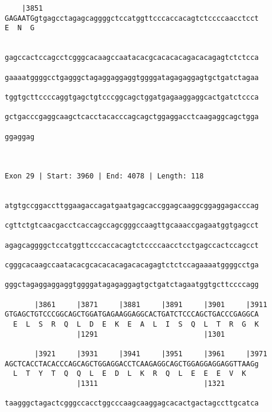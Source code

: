 \documentclass{article}
\begin{document}
\begin{Verbatim}
    |3851                                                   
GAGAATGgtgagcctagagcaggggctccatggttcccaccacagtctccccaacctcct
E  N  G                                                     
                                                            
  
gagccactccagcctcgggcacaagccaatacacgcacacacagacacagagtctctcca
                                                            
gaaaatggggcctgagggctagaggaggaggtggggatagagaggagtgctgatctagaa
                                                            
tggtgcttccccaggtgagctgtcccggcagctggatgagaaggaggcactgatctccca
                                                            
gctgacccgaggcaagctcacctacacccagcagctggaggacctcaagaggcagctgga
                                                            
ggaggag
       
       
 
Exon 29 | Start: 3960 | End: 4078 | Length: 118


atgtgccggaccttggaagaccagatgaatgagcaccggagcaaggcggaggagacccag
                                                            
cgttctgtcaacgacctcaccagccagcgggccaagttgcaaaccgagaatggtgagcct
                                                            
agagcaggggctccatggttcccaccacagtctccccaacctcctgagccactccagcct
                                                            
cgggcacaagccaatacacgcacacacagacacagagtctctccagaaaatggggcctga
                                                            
gggctagaggaggaggtggggatagagaggagtgctgatctagaatggtgcttccccagg
                                                            
       |3861     |3871     |3881     |3891     |3901     |3911
GTGAGCTGTCCCGGCAGCTGGATGAGAAGGAGGCACTGATCTCCCAGCTGACCCGAGGCA
  E  L  S  R  Q  L  D  E  K  E  A  L  I  S  Q  L  T  R  G  K
                 |1291                         |1301        
  
       |3921     |3931     |3941     |3951     |3961     |3971
AGCTCACCTACACCCAGCAGCTGGAGGACCTCAAGAGGCAGCTGGAGGAGGAGGTTAAGg
  L  T  Y  T  Q  Q  L  E  D  L  K  R  Q  L  E  E  E  V  K   
                 |1311                         |1321        
  
taagggctagactcgggccacctggcccaagcaaggagcacactgactagccttgcatca
                                                            

\end{Verbatim}
\end{document}
